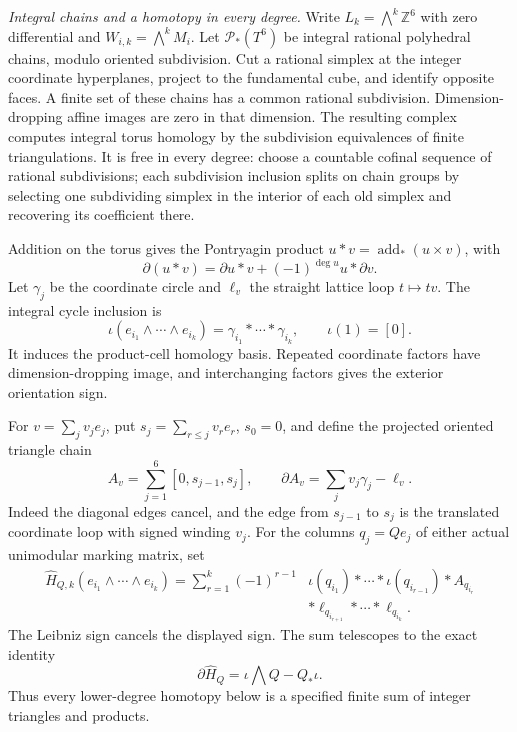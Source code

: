 \item \emph{Integral chains and a homotopy in every degree.}
Write $L_k=\bigwedge^k\mathbb Z^6$ with zero differential and
$W_{i,k}=\bigwedge^kM_i$. Let $\mathcal P_*(T^6)$ be integral
rational polyhedral chains, modulo oriented subdivision. Cut a
rational simplex at the integer coordinate hyperplanes, project to
the fundamental cube, and identify opposite faces. A finite set of
these chains has a common rational subdivision. Dimension-dropping
affine images are zero in that dimension. The resulting complex
computes integral torus homology by the subdivision equivalences of
finite triangulations. It is free in every degree: choose a countable
cofinal sequence of rational subdivisions; each subdivision inclusion
splits on chain groups by selecting one subdividing simplex in the
interior of each old simplex and recovering its coefficient there.

Addition on the torus gives the Pontryagin product
$u*v=\operatorname{add}_*(u\times v)$, with
\[
 \partial(u*v)=\partial u*v+(-1)^{\deg u}u*\partial v.
\]
Let $\gamma_j$ be the coordinate circle and $\ell_v$ the straight
lattice loop $t\mapsto tv$. The integral cycle inclusion is
\[
 \iota(e_{i_1}\wedge\cdots\wedge e_{i_k})
       =\gamma_{i_1}*\cdots*\gamma_{i_k},\qquad \iota(1)=[0].
\]
It induces the product-cell homology basis. Repeated coordinate
factors have dimension-dropping image, and interchanging factors
gives the exterior orientation sign.

For $v=\sum_jv_je_j$, put $s_j=\sum_{r\leq j}v_re_r$, $s_0=0$,
and define the projected oriented triangle chain
\[
 A_v=\sum_{j=1}^6[0,s_{j-1},s_j],\qquad
 \partial A_v=\sum_jv_j\gamma_j-\ell_v.
\]
Indeed the diagonal edges cancel, and the edge from $s_{j-1}$ to
$s_j$ is the translated coordinate loop with signed winding $v_j$.
For the columns $q_j=Qe_j$ of either actual unimodular marking matrix,
set
\[
\begin{split}
\widehat H_{Q,k}(e_{i_1}\wedge\cdots\wedge e_{i_k})
=\sum_{r=1}^k(-1)^{r-1}
 &\iota(q_{i_1})*\cdots*\iota(q_{i_{r-1}})*A_{q_{i_r}}\\
 &*\ell_{q_{i_{r+1}}}*\cdots*\ell_{q_{i_k}}.
\end{split}
\]
The Leibniz sign cancels the displayed sign. The sum telescopes to
the exact identity
\[
 \partial\widehat H_Q=\iota\bigwedge Q-Q_*\iota.
\]
Thus every lower-degree homotopy below is a specified finite sum
of integer triangles and products.

